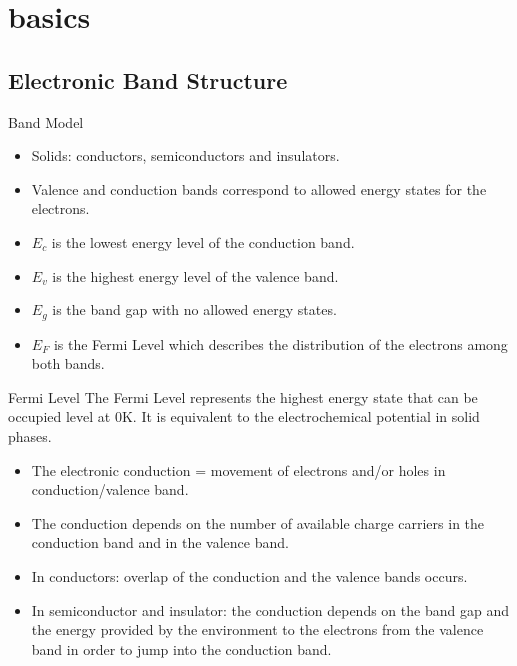 \documentclass[10pt,compress]{beamer}
\begin{document}
\section{basics}
\subsection{Electronic Band Structure}
    \begin{frame}[allowframebreaks=1.0]{Band Model}
        \begin{itemize}
            \item Solids: conductors, semiconductors and insulators. 
            \item Valence and conduction bands correspond to allowed energy states for the electrons. 
            \item $E_c$ is the lowest energy level of the conduction band.
            \item $E_v$ is the highest energy level of the valence band.
            \item $E_g$ is the band gap with no allowed energy states. 
            \item $E_F$ is the Fermi Level which describes the distribution of the electrons among both bands.
        \end{itemize}
        
        \begin{alertblock}{Fermi Level}
            \footnotesize
            The Fermi Level represents the highest energy state that can be occupied level at 0K. 
            It is equivalent to the electrochemical potential in solid phases.
        \end{alertblock}
        
        \framebreak
        \begin{itemize}
            \item The electronic conduction = movement of electrons and/or holes in conduction/valence band.
            \item The conduction depends on the number of available charge carriers
            in the conduction band and in the valence band. 
            \item In conductors: overlap of the conduction and the valence bands occurs. 
            \item In semiconductor and insulator: the conduction depends on the band gap and the energy provided by 
            the environment to the electrons from the valence band in order to jump 
            into the conduction band.
        \end{itemize}

        
    \end{frame}
\end{document}
